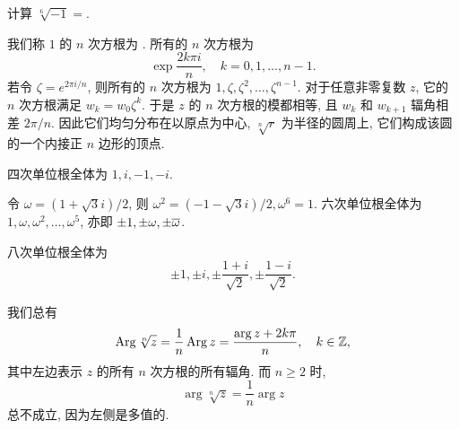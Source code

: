 \begin{exercise}
  计算 $\sqrt[6]{-1}=$\fillblank[12em]{}.
\end{exercise}

我们称 $1$ 的 $n$ 次方根为 .
所有的 $n$ 次方根为
\[
  \exp\frac{2k\pi i}n,\quad k=0,1,\dots,n-1.
\]
若令 $\zeta=e^{2\pi i/n}$, 则所有的 $n$ 次方根为 $1,\zeta,\zeta^2,\dots,\zeta^{n-1}$.
对于任意非零复数 $z$, 它的 $n$ 次方根满足 $w_k=w_0\zeta^k$.
于是 $z$ 的 $n$ 次方根的模都相等, 且 $w_k$ 和 $w_{k+1}$ 辐角相差 $2\pi/n$.
因此\alert{它们均匀分布在以原点为中心, $\sqrt[n]r$ 为半径的圆周上}, 它们构成该圆的一个内接正 $n$ 边形的顶点.

\begin{example}\delspace
  \begin{enumnopar}[(i)]
    \item 四次单位根全体为 $1,i,-1,-i$.
    \item 令 $\omega=(1+\sqrt 3i)/2$, 则 $\omega^2=(-1-\sqrt3i)/2, \omega^6=1$.
    六次单位根全体为 $1,\omega,\omega^2,\dots,\omega^5$, 亦即 $\pm1,\pm\omega,\pm\overline\omega$.
    \item 八次单位根全体为
    \[
      \pm1,\pm i,\pm\frac{1+i}{\sqrt2},\pm\frac{1-i}{\sqrt2}.
    \]
  \end{enumnopar}
\end{example}

我们总有
\[
  \operatorname{Arg} \sqrt[n]z=\dfrac1n\operatorname{Arg} z=\dfrac{\arg z+2k\pi}n,\quad k\in{\mathbb{Z}},
\]
其中左边表示 $z$ 的所有 $n$ 次方根的所有辐角.
而 $n\ge 2$ 时,
\[
  \arg \sqrt[n]z=\dfrac 1n\arg z
\]
总不成立, 因为左侧是多值的.




